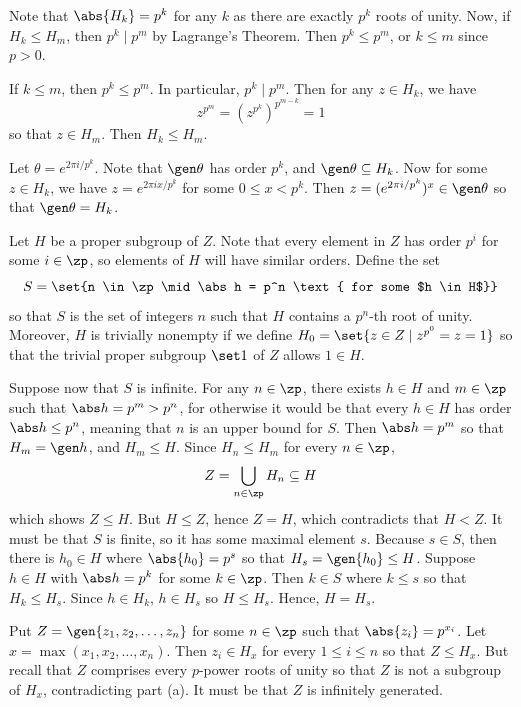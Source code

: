 \begin{solenum}
    \item Note that $\abs{H_k} = p^k$ for any $k$ as there are exactly $p^k$ roots of unity.
	Now, if $H_k \leq H_m$, then $p^k \mid p^m$ by Lagrange's Theorem.
	Then $p^k \leq p^m$, or $k \leq m$ since $p > 0$.
    
    If $k \leq m$, then $p^k \leq p^m$.
	In particular, $p^k \mid p^m$.
	Then for any $z \in H_k$, we have
    \[
    	z^{p^m} = (z^{p^k})^{p^{m - k}} = 1
    \]
    so that $z \in H_m$.
	Then $H_k \leq H_m$.
    \item Let $\theta = e^{2\pi i/p^k}$.
	Note that $\gen\theta$ has order $p^k$, and $\gen\theta \subseteq H_k$.
	Now for some $z \in H_k$, we have $z = e^{2\pi ix/p^k}$ for some $0 \leq x < p^k$.
	Then $z = (e^{2\pi i/p^k})^x \in \gen\theta$ so that $\gen\theta = H_k$.
    \item Let $H$ be a proper subgroup of $Z$.
	Note that every element in $Z$ has order $p^i$ for some $i \in \zp$, so elements of $H$ will have similar orders.
	Define the set
    \[
    	S = \set{n \in \zp \mid \abs h = p^n \text{ for some $h \in H$}}
    \]
    so that $S$ is the set of integers $n$ such that $H$ contains a $p^n$-th root of unity.
	Moreover, $H$ is trivially nonempty if we define $H_0 = \set{z \in Z \mid z^{p^0} = z = 1}$ so that the trivial proper subgroup $\set 1$ of $Z$ allows $1 \in H$.
    
    Suppose now that $S$ is infinite.
	For any $n \in \zp$, there exists $h \in H$ and $m \in \zp$ such that $\abs h = p^m > p^n$, for otherwise it would be that every $h \in H$ has order $\abs h \leq p^n$, meaning that $n$ is an upper bound for $S$.
	Then $\abs h = p^m$ so that $H_m = \gen h$, and $H_m \leq H$.
	Since $H_n \leq H_m$ for every $n \in \zp$,
    \[
    	Z = \bigcup_{n \in \zp} H_n \subseteq H
    \]
    which shows $Z \leq H$.
	But $H \leq Z$, hence $Z = H$, which contradicts that $H < Z$.
	It must be that $S$ is finite, so it has some maximal element $s$.
	Because $s \in S$, then there is $h_0 \in H$ where $\abs{h_0} = p^s$ so that $H_s = \gen{h_0} \leq H$.
	Suppose $h \in H$ with $\abs h = p^k$ for some $k \in \zp$.
	Then $k \in S$ where $k \leq s$ so that $H_k \leq H_s$.
	Since $h \in H_k$, $h \in H_s$ so $H \leq H_s$.
	Hence, $H = H_s$.
    \item Put $Z = \gen{z_1, z_2, \ldots, z_n}$ for some $n \in \zp$ such that $\abs{z_i} = p^{x_i}$.
	Let $x = \max(x_1, x_2, \ldots, x_n)$.
	Then $z_i \in H_x$ for every $1 \leq i \leq n$ so that $Z \leq H_x$.
	But recall that $Z$ comprises every $p$-power roots of unity so that $Z$ is not a subgroup of $H_x$, contradicting part (a).
	It must be that $Z$ is infinitely generated.
\end{solenum}

